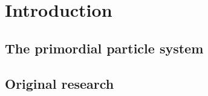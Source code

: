 \chapter{Introduction}

\section{The primordial particle system}

\section{Original research}

\cite{SSC16}
